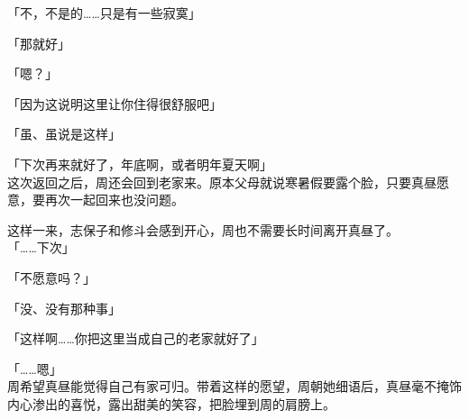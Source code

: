 「不，不是的……只是有一些寂寞」

「那就好」

「嗯？」

「因为这说明这里让你住得很舒服吧」

「虽、虽说是这样」

「下次再来就好了，年底啊，或者明年夏天啊」\\

这次返回之后，周还会回到老家来。原本父母就说寒暑假要露个脸，只要真昼愿意，要再次一起回来也没问题。

这样一来，志保子和修斗会感到开心，周也不需要长时间离开真昼了。\\

「……下次」

「不愿意吗？」

「没、没有那种事」

「这样啊……你把这里当成自己的老家就好了」

「……嗯」\\

周希望真昼能觉得自己有家可归。带着这样的愿望，周朝她细语后，真昼毫不掩饰内心渗出的喜悦，露出甜美的笑容，把脸埋到周的肩膀上。
